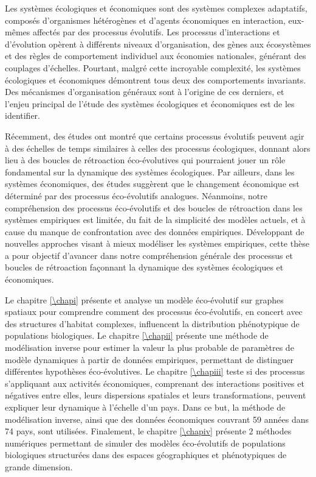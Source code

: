\small{
\noindent Les systèmes écologiques et économiques sont des systèmes complexes adaptatifs, composés d'organismes hétérogènes et d'agents économiques en interaction, eux-mêmes affectés par des processus évolutifs. Les processus d'interactions et d'évolution opèrent à différents niveaux d'organisation, des gènes aux écosystèmes et des règles de comportement individuel aux économies nationales, générant des couplages d'échelles. Pourtant, malgré cette incroyable complexité, les systèmes écologiques et économiques démontrent tous deux des comportements invariants. Des mécanismes d'organisation généraux sont à l'origine de ces derniers, et l'enjeu principal de l'étude des systèmes écologiques et économiques est de les identifier.
 
Récemment, des études ont montré que certains processus évolutifs peuvent agir à des échelles de temps similaires à celles des processus écologiques, donnant alors lieu à des boucles de rétroaction éco-évolutives qui pourraient jouer un rôle fondamental sur la dynamique des systèmes écologiques. Par ailleurs, dans les systèmes économiques, des études suggèrent que le changement économique est déterminé par des processus éco-évolutifs analogues. Néanmoins, notre compréhension des processus éco-évolutifs et des boucles de rétroaction dans les systèmes empiriques est limitée, du fait de la simplicité des modèles actuels, et à cause du manque de confrontation avec des données empiriques.  Développant de nouvelles approches visant à mieux modéliser les systèmes empiriques, cette thèse a pour objectif d'avancer dans notre compréhension générale des processus et boucles de rétroaction façonnant la dynamique des systèmes écologiques et économiques.
 
Le chapitre \ref{\chapi} présente et analyse un modèle éco-évolutif sur graphes spatiaux pour comprendre comment des processus éco-évolutifs, en concert avec des structures d'habitat complexes, influencent la distribution phénotypique de populations biologiques. Le chapitre \ref{\chapii} présente une méthode de modélisation inverse pour estimer la valeur la plus probable de paramètres de modèle dynamiques à partir de données empiriques, permettant de distinguer différentes hypothèses éco-évolutives. Le chapitre \ref{\chapiii} teste si des processus s'appliquant aux activités économiques, comprenant des interactions positives et négatives entre elles, leurs dispersions spatiales et leurs transformations, peuvent expliquer leur dynamique à l'échelle d'un pays. Dans ce but, la méthode de modélisation inverse, ainsi que des données économiques couvrant 59 années dans 74 pays, sont utilisées. Finalement, le chapitre \ref{\chapiv} présente 2 méthodes numériques permettant de simuler des modèles éco-évolutifs de populations biologiques structurées dans des espaces géographiques et phénotypiques de grande dimension.
 
}
